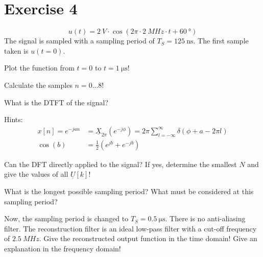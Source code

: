 %
%
%

{}
\section*{Exercise 4}

\begin{question}[subtitle={Sampling Periodic Signals}]
	\begin{equation*}
		u(t) = \SI{2}{V} \cdot \cos\left(2\pi \cdot \SI{2}{MHz} \cdot t + \SI{60}{\degree}\right)
	\end{equation*}
	The signal is sampled with a sampling period of $T_S = \SI{125}{\nano\second}$. The first sample taken is $u(t = 0)$.
	
	\begin{tasks}
		\task
		Plot the function from $t = 0$ to $t = \SI{1}{\micro\second}$!
		
		\task
		Calculate the samples $n = 0 \dots 8$!
		
		\task
		What is the DTFT of the signal?
		
		Hints:
		\begin{equation*}
			\begin{split}
				x[n] = e^{-j a n} &= \underline{X}_{2\pi}\left(e^{-j \phi}\right) = 2 \pi \sum\limits_{l = -\infty}^{\infty} \delta \left(\phi + a - 2\pi l\right) \\
				\cos\left(b\right) &= \frac{1}{2} \left(e^{j b} + e^{-j b}\right)
			\end{split}
		\end{equation*}
		
		\task
		Can the DFT directly applied to the signal? If yes, determine the smallest $N$ and give the values of all $\underline{U}[k]$!
		
		\task
		What is the longest possible sampling period? What must be considered at this sampling period?
		
		\task
		Now, the sampling period is changed to $T_S = \SI{0.5}{\micro\second}$. There is no anti-aliasing filter. The reconstruction filter is an ideal low-pass filter with a cut-off frequency of $\SI{2.5}{MHz}$. Give the reconstructed output function in the time domain! Give an explanation in the frequency domain!
	\end{tasks}
\end{question}

